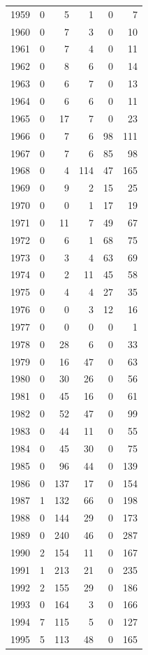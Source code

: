 \documentclass[
]{scrartcl}
\begin{document}
\begin{longtable}{rrrrrr}
1959 & 0 & 5 & 1 & 0 & 7 \\ 
1960 & 0 & 7 & 3 & 0 & 10 \\ 
1961 & 0 & 7 & 4 & 0 & 11 \\ 
1962 & 0 & 8 & 6 & 0 & 14 \\ 
1963 & 0 & 6 & 7 & 0 & 13 \\ 
1964 & 0 & 6 & 6 & 0 & 11 \\ 
1965 & 0 & 17 & 7 & 0 & 23 \\ 
1966 & 0 & 7 & 6 & 98 & 111 \\ 
1967 & 0 & 7 & 6 & 85 & 98 \\ 
1968 & 0 & 4 & 114 & 47 & 165 \\ 
1969 & 0 & 9 & 2 & 15 & 25 \\ 
1970 & 0 & 0 & 1 & 17 & 19 \\ 
1971 & 0 & 11 & 7 & 49 & 67 \\ 
1972 & 0 & 6 & 1 & 68 & 75 \\ 
1973 & 0 & 3 & 4 & 63 & 69 \\ 
1974 & 0 & 2 & 11 & 45 & 58 \\ 
1975 & 0 & 4 & 4 & 27 & 35 \\ 
1976 & 0 & 0 & 3 & 12 & 16 \\ 
1977 & 0 & 0 & 0 & 0 & 1 \\ 
1978 & 0 & 28 & 6 & 0 & 33 \\ 
1979 & 0 & 16 & 47 & 0 & 63 \\ 
1980 & 0 & 30 & 26 & 0 & 56 \\ 
1981 & 0 & 45 & 16 & 0 & 61 \\ 
1982 & 0 & 52 & 47 & 0 & 99 \\ 
1983 & 0 & 44 & 11 & 0 & 55 \\ 
1984 & 0 & 45 & 30 & 0 & 75 \\ 
1985 & 0 & 96 & 44 & 0 & 139 \\ 
1986 & 0 & 137 & 17 & 0 & 154 \\ 
1987 & 1 & 132 & 66 & 0 & 198 \\ 
1988 & 0 & 144 & 29 & 0 & 173 \\ 
1989 & 0 & 240 & 46 & 0 & 287 \\ 
1990 & 2 & 154 & 11 & 0 & 167 \\ 
1991 & 1 & 213 & 21 & 0 & 235 \\ 
1992 & 2 & 155 & 29 & 0 & 186 \\ 
1993 & 0 & 164 & 3 & 0 & 166 \\ 
1994 & 7 & 115 & 5 & 0 & 127 \\ 
1995 & 5 & 113 & 48 & 0 & 165 \\ 

\end{longtable}
\end{document}
